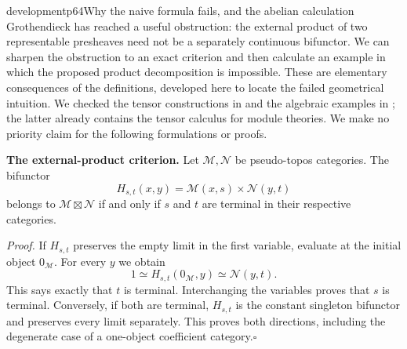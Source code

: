 \begin{dcomment}{development}{p64}{Why the naive formula fails, and the abelian calculation}
Grothendieck has reached a useful obstruction: the external product of two representable presheaves need not be a separately continuous bifunctor. We can sharpen the obstruction to an exact criterion and then calculate an example in which the proposed product decomposition is impossible. These are elementary consequences of the definitions, developed here to locate the failed geometrical intuition. We checked the tensor constructions in \citet[Section~6.5]{Kelly1982} and the algebraic examples in \citet[p.~95]{Freyd1966}; the latter already contains the tensor calculus for module theories. We make no priority claim for the following formulations or proofs.

\textbf{The external-product criterion.}\ours{}\quad
Let $\mathcal M,\mathcal N$ be pseudo-topos categories. The bifunctor
\[
 H_{s,t}(x,y)=\mathcal M(x,s)\times\mathcal N(y,t)
\]
belongs to $\mathcal M\boxtimes\mathcal N$ if and only if $s$ and $t$ are terminal in their respective categories.

\emph{Proof.} If $H_{s,t}$ preserves the empty limit in the first variable, evaluate at the initial object $0_{\mathcal M}$. For every $y$ we obtain
\[
 1\simeq H_{s,t}(0_{\mathcal M},y)
 \simeq\mathcal N(y,t).
\]
This says exactly that $t$ is terminal. Interchanging the variables proves that $s$ is terminal. Conversely, if both are terminal, $H_{s,t}$ is the constant singleton bifunctor and preserves every limit separately. This proves both directions, including the degenerate case of a one-object coefficient category.\hfill$\square$


\end{dcomment}
